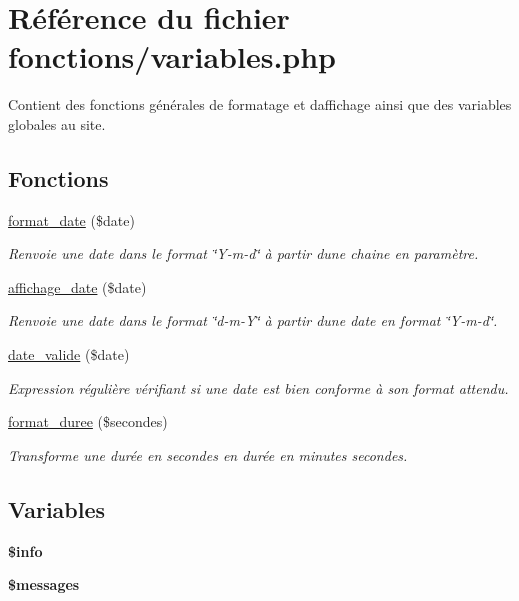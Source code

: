 \hypertarget{variables_8php}{}\section{Référence du fichier fonctions/variables.php}
\label{variables_8php}


Contient des fonctions générales de formatage et d\textquotesingle{}affichage ainsi que des variables globales au site.  


\subsection*{Fonctions}
\begin{DoxyCompactItemize}
\item 
\hyperlink{variables_8php_aac671b7526e88db82a81d2dbc528aff7}{format\+\_\+date} (\$date)
\begin{DoxyCompactList}\small\item\em Renvoie une date dans le format \char`\"{}\+Y-\/m-\/d\char`\"{} à partir d\textquotesingle{}une chaine en paramètre. \end{DoxyCompactList}\item 
\hyperlink{variables_8php_a34f898a3defe62bd4091aa4a4866eb05}{affichage\+\_\+date} (\$date)
\begin{DoxyCompactList}\small\item\em Renvoie une date dans le format \char`\"{}d-\/m-\/\+Y\char`\"{} à partir d\textquotesingle{}une date en format \char`\"{}\+Y-\/m-\/d\char`\"{}. \end{DoxyCompactList}\item 
\hyperlink{variables_8php_a2daec8f26b14f5950d5ab0cff23445f8}{date\+\_\+valide} (\$date)
\begin{DoxyCompactList}\small\item\em Expression régulière vérifiant si une date est bien conforme à son format attendu. \end{DoxyCompactList}\item 
\hyperlink{variables_8php_a3ef8ef70095240ef2a669927187e8816}{format\+\_\+duree} (\$secondes)
\begin{DoxyCompactList}\small\item\em Transforme une durée en secondes en durée en minutes secondes. \end{DoxyCompactList}\end{DoxyCompactItemize}
\subsection*{Variables}
\begin{DoxyCompactItemize}
\item 
{\bfseries \$info}
\item 
{\bfseries \$messages}
\end{DoxyCompactItemize}


